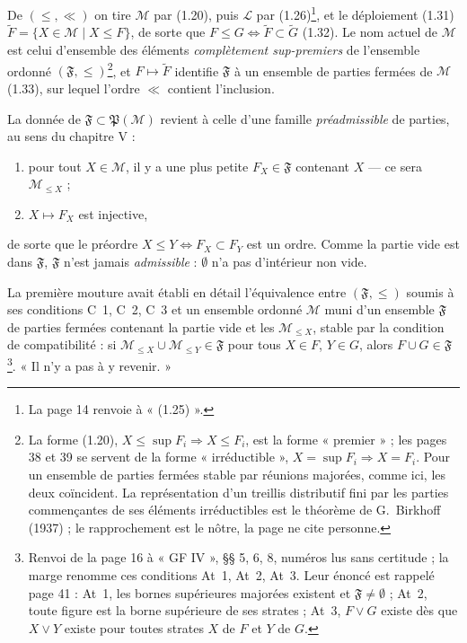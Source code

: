 \documentclass[11pt,a4paper]{article}
\begin{document}
De $(\leq, \ll)$ on tire $\mathcal{M}$ par (1.20), puis $\mathcal{L}$ par
(1.26)\footnote{La page 14 renvoie à « (1.25) ».}, et le déploiement (1.31)
$\widetilde{F} = \lbrace X \in \mathcal{M} \mid X \leq F \rbrace$, de sorte que
$F \leq G \iff \widetilde{F} \subset \widetilde{G}$ (1.32). Le nom actuel de
$\mathcal{M}$ est celui d'ensemble des éléments \emph{complètement
sup-premiers} de l'ensemble ordonné $(\mathfrak{F}, \leq)$\footnote{La forme
(1.20), $X \leq \sup F_{i} \Rightarrow X \leq F_{i}$, est la forme « premier » ;
les pages 38 et 39 se servent de la forme « irréductible », $X = \sup F_{i}
\Rightarrow X = F_{i}$. Pour un ensemble de parties fermées stable par
réunions majorées, comme ici, les deux coïncident. La représentation d'un treillis
distributif fini par les parties commençantes de ses éléments irréductibles est
le théorème de G.~Birkhoff (1937) ; le rapprochement est le nôtre, la page ne
cite personne.}, et $F \mapsto \widetilde{F}$ identifie $\mathfrak{F}$ à un
ensemble de parties fermées de $\mathcal{M}$ (1.33), sur lequel l'ordre $\ll$
contient l'inclusion.

La donnée de $\mathfrak{F} \subset \mathfrak{P}(\mathcal{M})$ revient à celle
d'une famille \emph{préadmissible} de parties, au sens du chapitre V :
\begin{enumerate}
\item[(i)] pour tout $X \in \mathcal{M}$, il y a une plus petite $F_{X} \in
\mathfrak{F}$ contenant $X$ --- ce sera $\mathcal{M}_{\leq X}$ ;
\item[(ii)] $X \mapsto F_{X}$ est injective,
\end{enumerate}
de sorte que le préordre $X \leq Y \iff F_{X} \subset F_{Y}$ est un ordre.
Comme la partie vide est dans $\mathfrak{F}$, $\mathfrak{F}$ n'est jamais
\emph{admissible} : $\emptyset$ n'a pas d'intérieur non vide.

La première mouture avait établi en détail l'équivalence entre $(\mathfrak{F},
\leq)$ soumis à ses conditions C~1, C~2, C~3 et un ensemble ordonné
$\mathcal{M}$ muni d'un ensemble $\mathfrak{F}$ de parties fermées contenant la
partie vide et les $\mathcal{M}_{\leq X}$, stable par la condition de
compatibilité : si $\mathcal{M}_{\leq X} \cup \mathcal{M}_{\leq Y} \in
\mathfrak{F}$ pour tous $X \in F$, $Y \in G$, alors $F \cup G \in
\mathfrak{F}$\footnote{Renvoi de la page 16 à « GF IV », §§ 5, 6, 8, numéros
lus sans certitude ; la marge renomme ces conditions At~1, At~2, At~3. Leur
énoncé est rappelé page 41 : At~1, les bornes supérieures majorées existent et
$\mathfrak{F} \neq \emptyset$ ; At~2, toute figure est la borne supérieure de
ses strates ; At~3, $F \vee G$ existe dès que $X \vee Y$ existe pour toutes
strates $X$ de $F$ et $Y$ de $G$.}. « Il n'y a pas à y revenir. »
\end{document}
